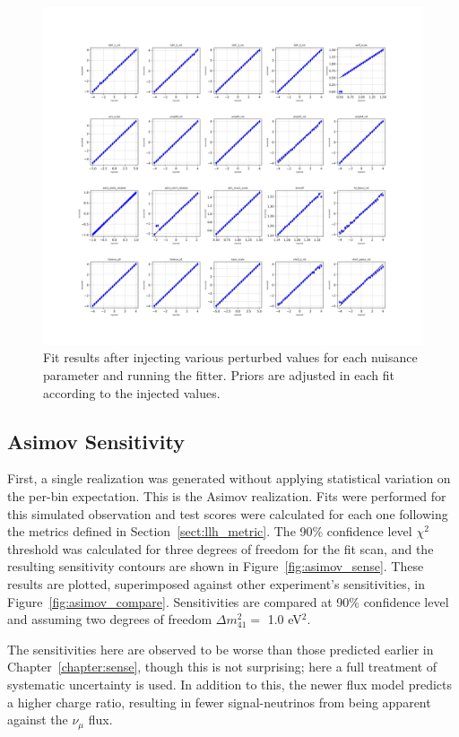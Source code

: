 \documentclass[main.tex]{subfiles}
\begin{document}
\begin{figure}
    \centering 
    \includegraphics[width=0.7\linewidth]{figures/inject_recover_syst_prior.png}
    \caption{Fit results after injecting various perturbed values for each nuisance parameter and running the fitter. Priors are adjusted in each fit according to the injected values.}\label{fig:ir_priorpert}
\end{figure}

\subsection{Asimov Sensitivity}

First, a single realization was generated without applying statistical variation on the per-bin expectation. 
This is the Asimov realization. 
Fits were performed for this simulated observation and test scores were calculated for each one following the metrics defined in Section~\ref{sect:llh_metric}.
The 90\% confidence level $\chi^{2}$ threshold was calculated for three degrees of freedom for the fit scan, and the resulting sensitivity contours are shown in Figure~\ref{fig:asimov_sense}. 
These results are plotted, superimposed against other experiment's sensitivities, in Figure~\ref{fig:asimov_compare}. 
Sensitivities are compared at 90\% confidence level and assuming two degrees of freedom $\Delta m_{41}^{2}=$ 1.0 eV$^{2}$.

The sensitivities here are observed to be worse than those predicted earlier in Chapter~\ref{chapter:sense}, though this is not surprising; here a full treatment of systematic uncertainty is used.
In addition to this, the newer flux model predicts a higher charge ratio, resulting in fewer signal-neutrinos from being apparent against the $\nu_{\mu}$ flux.
\end{document}

